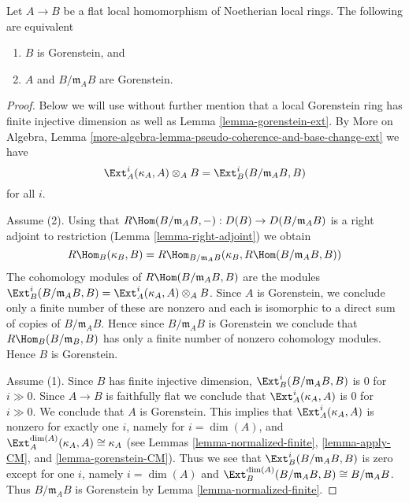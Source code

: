 \begin{lemma}
\label{lemma-flat-under-gorenstein}
Let $A \to B$ be a flat local homomorphism of Noetherian local rings.
The following are equivalent
\begin{enumerate}
\item $B$ is Gorenstein, and
\item $A$ and $B/\mathfrak m_A B$ are Gorenstein.
\end{enumerate}
\end{lemma}

\begin{proof}
Below we will use without further mention that a local Gorenstein ring
has finite injective dimension as well as Lemma \ref{lemma-gorenstein-ext}.
By More on Algebra, Lemma
\ref{more-algebra-lemma-pseudo-coherence-and-base-change-ext}
we have
$$
\Ext^i_A(\kappa_A, A) \otimes_A B =
\Ext^i_B(B/\mathfrak m_A B, B)
$$
for all $i$.

\medskip\noindent
Assume (2). Using that
$R\Hom(B/\mathfrak m_A B, -) : D(B) \to D(B/\mathfrak m_A B)$ is a
right adjoint to restriction (Lemma \ref{lemma-right-adjoint}) we obtain
$$
R\Hom_B(\kappa_B, B) =
R\Hom_{B/\mathfrak m_A B}(\kappa_B, R\Hom(B/\mathfrak m_A B, B))
$$
The cohomology modules of $R\Hom(B/\mathfrak m_A B, B)$ are the modules
$\Ext^i_B(B/\mathfrak m_A B, B) =
\Ext^i_A(\kappa_A, A) \otimes_A B$.
Since $A$ is Gorenstein, we conclude only a finite number of these are nonzero
and each is isomorphic to a direct sum of copies of $B/\mathfrak m_A B$.
Hence since $B/\mathfrak m_A B$ is Gorenstein we conclude that
$R\Hom_B(B/\mathfrak m_B, B)$ has only a finite number of nonzero
cohomology modules. Hence $B$ is Gorenstein.

\medskip\noindent
Assume (1). Since $B$ has finite injective dimension,
$\Ext^i_B(B/\mathfrak m_A B, B)$ is $0$ for $i \gg 0$.
Since $A \to B$ is faithfully flat
we conclude that $\Ext^i_A(\kappa_A, A)$ is $0$
for $i \gg 0$. We conclude that $A$ is Gorenstein. This implies that
$\Ext^i_A(\kappa_A, A)$ is nonzero for exactly one $i$,
namely for $i = \dim(A)$, and
$\Ext^{\dim(A)}_A(\kappa_A, A) \cong \kappa_A$
(see Lemmas \ref{lemma-normalized-finite}, \ref{lemma-apply-CM}, and
\ref{lemma-gorenstein-CM}).
Thus we see that
$\Ext^i_B(B/\mathfrak m_A B, B)$ is zero except for one $i$,
namely $i = \dim(A)$ and
$\Ext^{\dim(A)}_B(B/\mathfrak m_A B, B) \cong B/\mathfrak m_A B$.
Thus $B/\mathfrak m_A B$ is Gorenstein by
Lemma \ref{lemma-normalized-finite}.
\end{proof}

